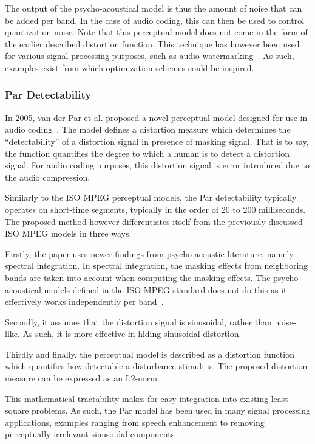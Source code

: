 The output of the psycho-acoustical model is thus the amount of noise that can be added per band.
In the case of audio coding, this can then be used to control quantization noise.
Note that this perceptual model does not come in the form of the earlier described distortion function.
This technique has however been used for various signal processing purposes, 
such as audio watermarking~\cite{taal2012low}.
As such, examples exist from which optimization schemes could be inspired.

\subsubsection{Par Detectability}
In 2005, van der Par et al. proposed a novel perceptual model designed for use in audio coding~\cite{van2005perceptual}.
The model defines a distortion measure which determines the ``detectability'' of a distortion signal 
in presence of  masking signal.
That is to say, the function quantifies the degree to which a human is to detect a distortion signal.
For audio coding purposes, this distortion signal is error introduced due to the audio compression.

Similarly to the ISO MPEG perceptual models, the Par detectability typically operates on short-time segments, typically in the order of 20 to 200 milliseconds.
The proposed method however differentiates itself from the previously discussed ISO MPEG models in three ways.

Firstly, the paper uses newer findings from psycho-acoustic literature, namely spectral integration.
In spectral integration, the masking effects from neighboring bands are taken into account when computing the 
masking effects.
The psycho-acoustical models defined in the ISO MPEG standard does not do this as it effectively 
works independently per band~\cite{taal2012low}.

Secondly, it assumes that the distortion signal is sinusoidal, rather than noise-like.
As such, it is more effective in hiding sinusoidal distortion.

Thirdly and finally, the perceptual model is described as a distortion function which quantifies how 
detectable a disturbance stimuli is.
The proposed distortion measure can be expressed as an L2-norm.

This mathematical tractability makes for easy integration into existing least-square problems.
As such, the Par model has been used in many signal processing applications, 
examples ranging from speech enhancement to removing perceptually irrelevant sinusoidal 
components~\cite{balazs2009time, taal2013optimal}.

